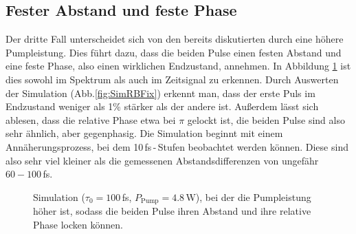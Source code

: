 \documentclass[bachelor,       %
               twoside,        %
               BCOR10mm,       %
               liststotoc,nomtotoc,bibtotoc, %
               english,ngerman, %
               final,          %
               ]{GAUBM}
\begin{document}
\subsection{Fester Abstand und feste Phase}
Der dritte Fall unterscheidet sich von den bereits diskutierten durch eine höhere Pumpleistung.
Dies führt dazu, dass die beiden Pulse einen festen Abstand und eine feste Phase, also einen wirklichen Endzustand, annehmen.
In Abbildung \ref{fig:SimulationFixed} ist dies sowohl im Spektrum als auch im Zeitsignal zu erkennen.
Durch Auswerten der Simulation (Abb.\ref{fig:SimRBFix}) erkennt man, dass der erste Puls im Endzustand weniger als 1\% stärker als der andere ist.
Außerdem lässt sich ablesen, dass die relative Phase etwa bei $\pi$ gelockt ist, die beiden Pulse sind also sehr ähnlich, aber gegenphasig.
Die Simulation beginnt mit einem Annäherungsprozess, bei dem 10\,fs\,-\,Stufen beobachtet werden können.
Diese sind also sehr viel kleiner als die gemessenen Abstandsdifferenzen von ungefähr $60-100\,$fs.
\begin{figure}[!htb]
   \centering
   \hfill
   \caption{Simulation ($\tau_0=100\,$fs, $P_\text{Pump}=4.8\,$W), bei der die Pumpleistung höher ist, sodass die beiden Pulse ihren Abstand und ihre relative Phase locken können.}
   \label{fig:SimulationFixed}
\end{figure}
\end{document}
